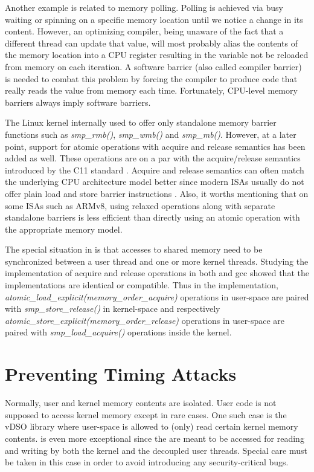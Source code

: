Another example is related to memory polling. Polling is achieved via busy
waiting or spinning on a specific memory location until we notice a change in
its content. However, an optimizing compiler, being unaware of the fact that a
different thread can update that value, will most probably alias the contents
of the memory location into a CPU register resulting in the variable not be
reloaded from memory on each iteration. A software barrier (also called
compiler barrier) is needed to combat this problem by forcing the compiler to
produce code that really reads the value from memory each time. Fortunately,
CPU-level memory barriers always imply software barriers.

The Linux kernel internally used to offer only standalone memory barrier
functions such as \emph{smp\_rmb()}, \emph{smp\_wmb()} and \emph{smp\_mb()}.
However, at a later point, support for atomic operations with acquire and
release semantics has been added as well. These operations are on a par with
the acquire/release semantics introduced by the C11 standard \cite{c11}.
Acquire and release semantics can often match the underlying CPU architecture
model better since modern ISAs usually do not offer plain load and store
barrier instructions \cite{membarriers_paul}. Also, it worths mentioning that
on some ISAs such as ARMv8, using relaxed operations along with separate
standalone barriers is less efficient than directly using an atomic operation
with the appropriate memory model.

The special situation in \memsc is that accesses to shared memory need to be
synchronized between a user thread and one or more kernel threads. Studying the
implementation of acquire and release operations in both \llinux and gcc showed
that the implementations are identical or compatible. Thus in the \memsc
implementation, \emph{atomic\_load\_explicit(memory\_order\_acquire)}
operations in user-space are paired with \emph{smp\_store\_release()} in
kernel-space and respectively
\emph{atomic\_store\_explicit(memory\_order\_release)} operations in user-space
are paired with \emph{smp\_load\_acquire()} operations inside the kernel.

\section{Preventing Timing Attacks}

Normally, user and kernel memory contents are isolated. User code is not
supposed to access kernel memory except in rare cases. One such case is the
vDSO library where user-space is allowed to (only) read certain kernel memory
contents.  \memsc is even more exceptional since the  are meant to be
accessed for reading and writing by both the kernel and the decoupled user
threads. Special care must be taken in this case in order to avoid introducing
any security-critical bugs.

